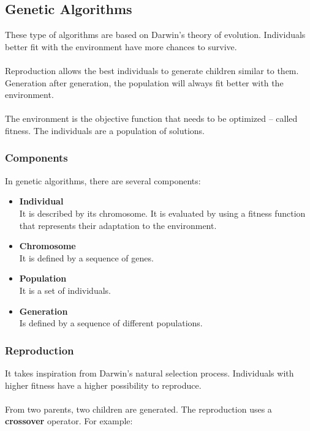 \documentclass{article}
\begin{document}
\subsection{Genetic Algorithms}
These type of algorithms are based on Darwin's theory of evolution. Individuals better fit with the environment have more chances to survive. \\ \\
Reproduction allows the best individuals to generate children similar to them. Generation after generation, the population will always fit better with the environment. \\ \\
The environment is the objective function that needs to be optimized -- called fitness. The individuals are a population of solutions.

\subsubsection{Components}
In genetic algorithms, there are several components:

\begin{itemize}
	\item \textbf{Individual}
	\vspace{.2cm} \\
	It is described by its chromosome. It is evaluated by using a fitness function that represents their adaptation to the environment.
	
	\item \textbf{Chromosome}
	\vspace{.2cm} \\
	It is defined by a sequence of genes.
	
	\item \textbf{Population}
	\vspace{.2cm} \\
	It is a set of individuals.
	
	\item \textbf{Generation}
	\vspace{.2cm} \\
	Is defined by a sequence of different populations.	
\end{itemize}

\subsubsection{Reproduction}
It takes inspiration from Darwin's natural selection process. Individuals with higher fitness have a higher possibility to reproduce. \\ \\
From two parents, two children are generated. The reproduction uses a \textbf{crossover} operator. For example:
\end{document}
